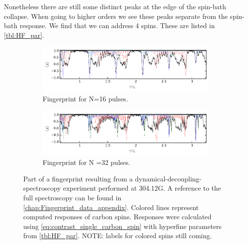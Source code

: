 Nonetheless there are still some distinct peaks at the edge of the spin-bath collapse. When going to higher orders we see these peaks separate from the spin-bath response.
We find that we can address 4 spins.
These are listed in \cref{tbl:HF_par}. %


\begin{figure}[htbp]

    \begin{subfigure}[t]{\textwidth}\centering
        \centering
        \includegraphics{Img/fingerprint16.pdf}
        \caption{Fingerprint for N=16 pulses. }
        \label{fig:FP16}
    \end{subfigure}

    \begin{subfigure}[t]{\textwidth}\centering
        \centering
        \includegraphics{Img/fingerprint32.pdf}
        \caption{Fingerprint for N =32 pulses. }
        \label{fig:FP32}
    \end{subfigure}
    \caption{Part of a fingerprint resulting from a dynamical-decoupling-spectroscopy experiment performed at 304.12G. A reference to the full spectroscopy can be found in \cref{chap:Fingerprint_data_appendix}.  Colored lines represent computed responses of carbon spins. Responses were calculated using \cref{eq:contrast_single_carbon_spin} with hyperfine parameters from \cref{tbl:HF_par}. NOTE: labels for colored spins still coming. }
    \label{fig:FP}
\end{figure}


